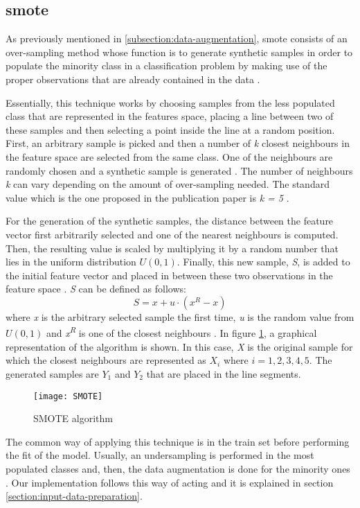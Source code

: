 
\subsection{\acrfull{smote}}
\label{subsection:smote}

	As previously mentioned in \ref{subsection:data-augmentation}, \acrshort{smote} consists of an over-sampling method whose function is to generate synthetic samples in order to populate the minority class in a classification problem by making use of the proper observations that are already contained in the data \cite{Chawla2002}. 
	
	Essentially, this technique works by choosing samples from the less populated class that are represented in the features space, placing a line between two of these samples and then selecting a point inside the line at a random position. First, an arbitrary sample is picked and then a number of \textit{k} closest neighbours in the feature space are selected from the same class. One of the neighbours are randomly chosen and a synthetic sample is generated \cite{Browniee2020}. The number of neighbours \textit{k} can vary depending on the amount of over-sampling needed. The standard value which is the one proposed in the publication paper is \textit{k = 5} \cite{Chawla2002}. 
	
	For the generation of the synthetic samples, the distance between the feature vector first arbitrarily selected and one of the nearest neighbours is computed. Then, the resulting value is scaled by multiplying it by a random number that lies in the uniform distribution $U(0,1)$. Finally, this new sample, \textit{S}, is added to the initial feature vector and placed in between these two observations in the feature space \cite{Chawla2002}. \textit{S} can be defined as follows:
	\[S = x + u\cdot(x^{R} - x) \]
	where \textit{x} is the arbitrary selected sample the first time, \textit{u} is the random value from $U(0,1)$ and \textit{x\textsuperscript{R}} is one of the closest neighbours \cite{Blagus2013}. In figure \ref{fig:mesh47}, a graphical representation of the algorithm is shown. In this case, \textit{X} is the original sample for which the closest neighbours are represented as $X_{i}$ where $i=1,2,3,4,5$. The generated samples are $Y_{1}$ and $Y_{2}$ that are placed in the line segments.
	
	\begin{figure}
		\centering
		\captionsetup{justification=centering}
		\texttt{[image: SMOTE]}
		\caption{SMOTE algorithm \cite{Xie2015}}
		\label{fig:mesh47}
	\end{figure}

	The common way of applying this technique is in the train set before performing the fit of the model. Usually, an undersampling is performed in the most populated classes and, then, the data augmentation is done for the minority ones \cite{Browniee2020}. Our implementation follows this way of acting and it is explained in section \ref{section:input-data-preparation}.
	
	 